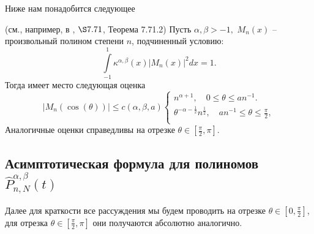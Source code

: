 \noindent Ниже нам понадобится следующее

\begin{statement}
\label{SMS1:state1}
    (см., например, в \cite{idprmgreenBook}, $\S7.71$, Теорема 7.71.2) Пусть $\alpha,\beta>-1,$ $M_n(x)$ -- произвольный полином степени $n$, подчиненный условию:
    \begin{equation*}
    \int\limits_{-1}^{1} \kappa^{\alpha,\beta}(x) |M_n(x)|^2 dx = 1.
    \end{equation*}
    Тогда имеет место следующая оценка
    \begin{equation}
    \label{SultM_eq15}
    \left|M_n(\cos(\theta))\right| \leq c(\alpha,\beta,a)
    \left\{
    \begin{aligned}
    n^{\alpha+1},\quad 0\leq\theta\leq an^{-1}.\\
    \theta^{-\alpha-\frac{1}{2}}n^{\frac{1}{2}},\quad an^{-1}\leq\theta\leq \frac{\pi}{2},\\
    \end{aligned}
    \right.
    \end{equation}
    Аналогичные оценки справедливы на отрезке   $\theta \in \left[ \frac{\pi}{2}, \pi\right]$.
\end{statement}


\subsection{Асимптотическая формула для полиномов $\hat{P}_{n,N}^{\alpha,\beta}(t)$}

Далее для краткости все рассуждения мы будем проводить на отрезке $\theta \in \left[ 0,\frac{\pi}{2}\right]$, для отрезка $\theta \in \left[ \frac{\pi}{2}, \pi\right]$ они получаются абсолютно аналогично.

